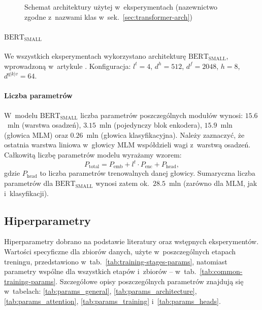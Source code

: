 \documentclass[a4paper,11pt,twoside]{report}
\theoremstyle{definition}
\begin{document}
\begin{figure}[t!]
{
    }
    \caption{Schemat architektury użytej w~eksperymentach (nazewnictwo zgodne z~nazwami klas w~sek.~\ref{sec:transformer-arch})}
    \label{fig:exp-arch-diagram}
\end{figure}

\paragraph{$\text{BERT}_{\text{SMALL}}$} 
We wszystkich eksperymentach wykorzystano architekturę $\text{BERT}_{\text{SMALL}}$, wprowadzoną w~artykule \textcite{turc2019well}.
Konfiguracja: $l^t = 4$, $d^h = 512$, $d^f = 2048$, $h = 8$, $d^{q|k|v} = 64$.


\paragraph{Liczba parametrów}
W~modelu $\text{BERT}_{\text{SMALL}}$ liczba parametrów poszczególnych modułów wynosi: $15.6$~mln (warstwa osadzeń), $3.15$~mln (pojedynczy blok enkodera), $15.9$~mln (głowica MLM) oraz $0.26$~mln (głowica klasyfikacyjna).
Należy zaznaczyć, że ostatnia warstwa liniowa w~głowicy MLM współdzieli wagi z~warstwą osadzeń. Całkowitą liczbę parametrów modelu wyrażamy wzorem:
\begin{equation}
P_{\text{total}} = P_{\text{emb}} + l^t \cdot P_{\text{enc}} + P_{\text{head}},
\end{equation}
gdzie $P_{\text{head}}$ to liczba parametrów trenowalnych danej głowicy.
Sumaryczna liczba parametrów dla $\text{BERT}_{\text{SMALL}}$ wynosi zatem ok.\ $28.5$~mln (zarówno dla MLM, jak i~klasyfikacji).

\subsection{Hiperparametry}
Hiperparametry dobrano na podstawie literatury oraz wstępnych eksperymentów. Wartości specyficzne dla zbiorów danych, użyte w~poszczególnych etapach treningu, przedstawiono w~tab.~\ref{tab:training-stages-params}, natomiast parametry wspólne dla wszystkich etapów i~zbiorów -- w~tab.~\ref{tab:common-training-params}. Szczegółowe opisy poszczególnych parametrów znajdują się w~tabelach: \ref{tab:params_general}, \ref{tab:params_architecture}, \ref{tab:params_attention}, \ref{tab:params_training} i~\ref{tab:params_heads}.
\end{document}
